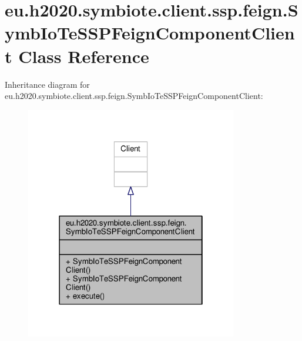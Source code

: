 \hypertarget{classeu_1_1h2020_1_1symbiote_1_1client_1_1ssp_1_1feign_1_1SymbIoTeSSPFeignComponentClient}{}\section{eu.\+h2020.\+symbiote.\+client.\+ssp.\+feign.\+Symb\+Io\+Te\+S\+S\+P\+Feign\+Component\+Client Class Reference}
\label{classeu_1_1h2020_1_1symbiote_1_1client_1_1ssp_1_1feign_1_1SymbIoTeSSPFeignComponentClient}


Inheritance diagram for eu.\+h2020.\+symbiote.\+client.\+ssp.\+feign.\+Symb\+Io\+Te\+S\+S\+P\+Feign\+Component\+Client\+:\nopagebreak
\begin{figure}[H]
\begin{center}
\leavevmode
\includegraphics[width=262pt]{classeu_1_1h2020_1_1symbiote_1_1client_1_1ssp_1_1feign_1_1SymbIoTeSSPFeignComponentClient__inherit__graph}
\end{center}
\end{figure}



